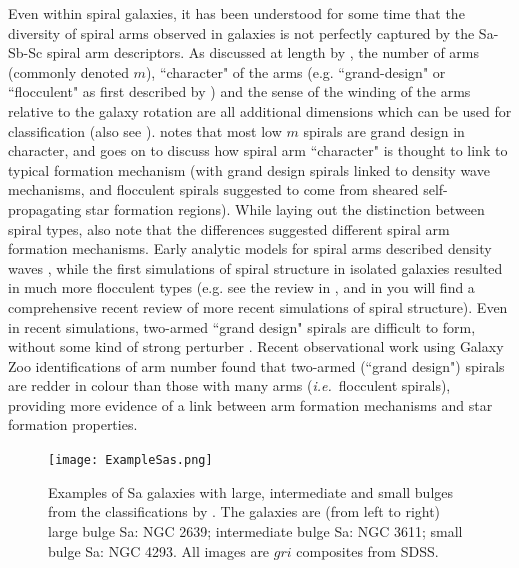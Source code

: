 \documentclass[usenatbib]{mn2e}
\newcommand{\ie}{{\it i.e.}}
\begin{document}
 Even within spiral galaxies, it has been understood for some time that the diversity of spiral arms observed in galaxies is not perfectly captured by the Sa-Sb-Sc spiral arm descriptors. As discussed at length by \citet{Buta2013}, the number of arms (commonly denoted $m$), ``character" of the arms (e.g. ``grand-design" or ``flocculent" as first described by \citealt{Elmegreen1981}) and the sense of the winding of the arms relative to the galaxy rotation are all additional dimensions which can be used for classification (also see \citealt{1987ApJ...314....3E,AnnLee2013}). \citet{Buta2013} notes that most low $m$ spirals are grand design in character, and goes on to discuss how spiral arm ``character" is thought to link to typical formation mechanism (with grand design spirals linked to density wave mechanisms, and flocculent spirals suggested to come from sheared self-propagating star formation regions). While laying out the distinction between spiral types, \citet{Elmegreen1981} also note that the differences suggested different spiral arm formation mechanisms. Early analytic models for spiral arms described density waves \citep{LinShu1964}, while the first simulations of spiral structure in isolated galaxies resulted in much more flocculent types (e.g. see the review in \citealt{Elmegreen1981}, and in  \citet{DobbsBaba2014} you will find a comprehensive recent review of more recent simulations of spiral structure). Even in recent simulations, two-armed ``grand design" spirals are difficult to form, without some kind of strong perturber \citep{Sellwood2011}. Recent observational work using Galaxy Zoo identifications of arm number \citep{Hart2016,Hart2017a} found that two-armed (``grand design") spirals are redder in colour than those with many arms (\ie ~flocculent spirals), providing more evidence of a link between arm formation mechanisms and star formation properties.  

\begin{figure}
\texttt{[image: ExampleSas.png]}
\caption{Examples of Sa galaxies with large, intermediate and small bulges from the classifications by \citet{Hogg1993}.  The galaxies are (from left to right) large bulge Sa: NGC 2639; intermediate bulge Sa: NGC 3611; small bulge Sa: NGC 4293. All images are $gri$ composites from SDSS. \label{Sa}}
\end{figure}
\end{document}
